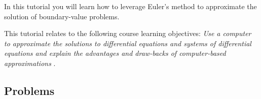 \begin{objectives}
	In this tutorial you will learn how to leverage Euler's method to approximate the solution of boundary-value problems.

	This tutorial relates to the following course learning objectives:
	\textit{
		Use a computer to approximate the solutions to differential equations and systems of differential
		equations and explain the advantages and draw-backs of computer-based approximations
	}.
\end{objectives}


\vspace{-.5em}
\subsection*{Problems}
\vspace{-.5em}






